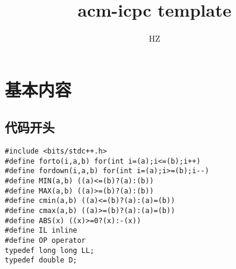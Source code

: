 \documentclass{article}
\begin{document}
\title{acm-icpc template}
\author{HZ}
\maketitle

\section{基本内容}

\subsection{代码开头}
\begin{lstlisting}
#include <bits/stdc++.h>
#define forto(i,a,b) for(int i=(a);i<=(b);i++)
#define fordown(i,a,b) for(int i=(a);i>=(b);i--)
#define MIN(a,b) ((a)<=(b)?(a):(b))
#define MAX(a,b) ((a)>=(b)?(a):(b))
#define cmin(a,b) ((a)<=(b)?(a):(a)=(b))
#define cmax(a,b) ((a)>=(b)?(a):(a)=(b))
#define ABS(x) ((x)>=0?(x):-(x))
#define IL inline
#define OP operator
typedef long long LL;
typedef double D;
\end{lstlisting}
\end{document}
